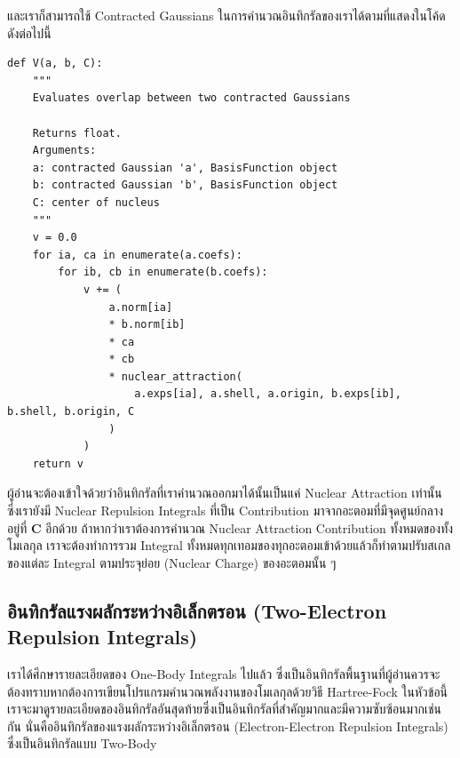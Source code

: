 \vspace{5pt}

\noindent และเราก็สามารถใช้ Contracted Gaussians ในการคำนวณอินทิกรัลของเราได้ตามที่แสดงในโค้ดดังต่อไปนี้

\vspace{5pt}

\begin{lstlisting}[style=MyPython]
def V(a, b, C):
    """
    Evaluates overlap between two contracted Gaussians

    Returns float.
    Arguments:
    a: contracted Gaussian 'a', BasisFunction object
    b: contracted Gaussian 'b', BasisFunction object
    C: center of nucleus
    """
    v = 0.0
    for ia, ca in enumerate(a.coefs):
        for ib, cb in enumerate(b.coefs):
            v += (
                a.norm[ia]
                * b.norm[ib]
                * ca
                * cb
                * nuclear_attraction(
                    a.exps[ia], a.shell, a.origin, b.exps[ib], b.shell, b.origin, C
                )
            )
    return v
\end{lstlisting}

\vspace{5pt}

ผู้อ่านจะต้องเข้าใจด้วยว่าอินทิกรัลที่เราคำนวณออกมาได้นั้นเป็นแค่ Nuclear Attraction เท่านั้น ซึ่งเรายังมี Nuclear Repulsion Integrals ที่เป็น Contribution มาจากอะตอมที่มีจุดศูนย์กลางอยู่ที่ $\mathbf{C}$ อีกด้วย ถ้าหากว่าเราต้องการคำนวณ Nuclear Attraction Contribution ทั้งหมดของทั้งโมเลกุล เราจะต้องทำการรวม Integral ทั้งหมดทุกเทอมของทุกอะตอมเข้าด้วยแล้วก็ทำตามปรับสเกลของแต่ละ Integral ตามประจุย่อย (Nuclear Charge) ของอะตอมนั้น ๆ

\subsection{อินทิกรัลแรงผลักระหว่างอิเล็กตรอน (Two-Electron Repulsion Integrals)}

เราได้ศึกษารายละเอียดของ One-Body Integrals ไปแล้ว ซึ่งเป็นอินทิกรัลพื้นฐานที่ผู้อ่านควรจะต้องทราบหากต้องการเขียนโปรแกรมคำนวณพลังงานของโมเลกุลด้วยวิธี Hartree-Fock ในหัวข้อนี้เราจะมาดูรายละเอียดของอินทิกรัลอันสุดท้ายซึ่งเป็นอินทิกรัลที่สำคัญมากและมีความซับซ้อนมากเช่นกัน นั่นคืออินทิกรัลของแรงผลักระหว่างอิเล็กตรอน (Electron-Electron Repulsion Integrals) ซึ่งเป็นอินทิกรัลแบบ Two-Body

